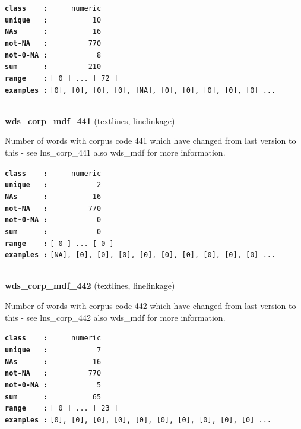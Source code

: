 \documentclass[]{article}
\begin{document}
\textbf{\texttt{class\ \ \ \ :}} \texttt{~~~~~numeric}\\
\textbf{\texttt{unique\ \ \ :}} \texttt{~~~~~~~~~~10}\\
\textbf{\texttt{NAs\ \ \ \ \ \ :}} \texttt{~~~~~~~~~~16}\\
\textbf{\texttt{not-NA\ \ \ :}} \texttt{~~~~~~~~~770}\\
\textbf{\texttt{not-0-NA\ :}} \texttt{~~~~~~~~~~~8}\\
\textbf{\texttt{sum\ \ \ \ \ \ :}} \texttt{~~~~~~~~~210}\\
\textbf{\texttt{range\ \ \ \ :}}
\texttt{{[}\ 0\ {]}\ ...\ {[}\ 72\ {]}}\\
\textbf{\texttt{examples\ :}}
\texttt{{[}0{]},\ {[}0{]},\ {[}0{]},\ {[}0{]},\ {[}NA{]},\ {[}0{]},\ {[}0{]},\ {[}0{]},\ {[}0{]},\ {[}0{]}\ ...}\\

~

\textbf{wds\_corp\_mdf\_441} (textlines, linelinkage)

Number of words with corpus code 441 which have changed from last
version to this - see lns\_corp\_441 also wds\_mdf for more information.

\textbf{\texttt{class\ \ \ \ :}} \texttt{~~~~~numeric}\\
\textbf{\texttt{unique\ \ \ :}} \texttt{~~~~~~~~~~~2}\\
\textbf{\texttt{NAs\ \ \ \ \ \ :}} \texttt{~~~~~~~~~~16}\\
\textbf{\texttt{not-NA\ \ \ :}} \texttt{~~~~~~~~~770}\\
\textbf{\texttt{not-0-NA\ :}} \texttt{~~~~~~~~~~~0}\\
\textbf{\texttt{sum\ \ \ \ \ \ :}} \texttt{~~~~~~~~~~~0}\\
\textbf{\texttt{range\ \ \ \ :}}
\texttt{{[}\ 0\ {]}\ ...\ {[}\ 0\ {]}}\\
\textbf{\texttt{examples\ :}}
\texttt{{[}NA{]},\ {[}0{]},\ {[}0{]},\ {[}0{]},\ {[}0{]},\ {[}0{]},\ {[}0{]},\ {[}0{]},\ {[}0{]},\ {[}0{]}\ ...}\\

~

\textbf{wds\_corp\_mdf\_442} (textlines, linelinkage)

Number of words with corpus code 442 which have changed from last
version to this - see lns\_corp\_442 also wds\_mdf for more information.

\textbf{\texttt{class\ \ \ \ :}} \texttt{~~~~~numeric}\\
\textbf{\texttt{unique\ \ \ :}} \texttt{~~~~~~~~~~~7}\\
\textbf{\texttt{NAs\ \ \ \ \ \ :}} \texttt{~~~~~~~~~~16}\\
\textbf{\texttt{not-NA\ \ \ :}} \texttt{~~~~~~~~~770}\\
\textbf{\texttt{not-0-NA\ :}} \texttt{~~~~~~~~~~~5}\\
\textbf{\texttt{sum\ \ \ \ \ \ :}} \texttt{~~~~~~~~~~65}\\
\textbf{\texttt{range\ \ \ \ :}}
\texttt{{[}\ 0\ {]}\ ...\ {[}\ 23\ {]}}\\
\textbf{\texttt{examples\ :}}
\texttt{{[}0{]},\ {[}0{]},\ {[}0{]},\ {[}0{]},\ {[}0{]},\ {[}0{]},\ {[}0{]},\ {[}0{]},\ {[}0{]},\ {[}0{]}\ ...}\\
\end{document}
